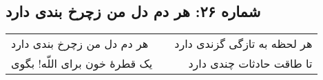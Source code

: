 \begin{center}
\section*{شماره ۲۶: هر دم دل من زچرخ بندی دارد}
\label{sec:026}
\begin{longtable}{l p{0.5cm} r}
هر دم دل من زچرخ بندی دارد
&&
هر لحظه به تازگی گزندی دارد
\\
یک قطرهٔ خون برای اللّه! بگوی
&&
تا طاقت حادثات چندی دارد
\\
\end{longtable}
\end{center}
